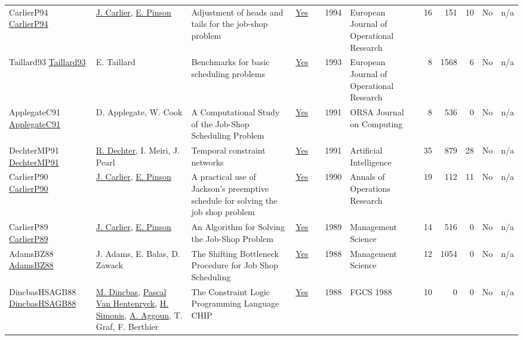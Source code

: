 {\begin{longtable}{>{\raggedright\arraybackslash}p{3cm}>{\raggedright\arraybackslash}p{6cm}>{\raggedright\arraybackslash}p{6.5cm}rrrp{2.5cm}rrrrr}
CarlierP94 \href{http://dx.doi.org/10.1016/0377-2217(94)90379-4}{CarlierP94} & \hyperref[auth:a858]{J. Carlier}, \hyperref[auth:a859]{E. Pinson} & Adjustment of heads and tails for the job-shop problem & \href{../works/CarlierP94.pdf}{Yes} & \cite{CarlierP94} & 1994 & European Journal of Operational Research & 16 & 151 & 10 & No & n/a\\
Taillard93 \href{http://dx.doi.org/10.1016/0377-2217(93)90182-m}{Taillard93} & E. Taillard & Benchmarks for basic scheduling problems & \href{../works/Taillard93.pdf}{Yes} & \cite{Taillard93} & 1993 & European Journal of Operational Research & 8 & 1568 & 6 & No & n/a\\
ApplegateC91 \href{http://dx.doi.org/10.1287/ijoc.3.2.149}{ApplegateC91} & D. Applegate, W. Cook & A Computational Study of the Job-Shop Scheduling Problem & \href{../works/ApplegateC91.pdf}{Yes} & \cite{ApplegateC91} & 1991 & ORSA Journal on Computing & 8 & 536 & 0 & No & n/a\\
DechterMP91 \href{http://dx.doi.org/10.1016/0004-3702(91)90006-6}{DechterMP91} & \hyperref[auth:a303]{R. Dechter}, I. Meiri, J. Pearl & Temporal constraint networks & \href{../works/DechterMP91.pdf}{Yes} & \cite{DechterMP91} & 1991 & Artificial Intelligence & 35 & 879 & 28 & No & n/a\\
CarlierP90 \href{http://dx.doi.org/10.1007/bf03543071}{CarlierP90} & \hyperref[auth:a858]{J. Carlier}, \hyperref[auth:a859]{E. Pinson} & A practical use of Jackson's preemptive schedule for solving the job shop problem & \href{../works/CarlierP90.pdf}{Yes} & \cite{CarlierP90} & 1990 & Annals of Operations Research & 19 & 112 & 11 & No & n/a\\
CarlierP89 \href{http://dx.doi.org/10.1287/mnsc.35.2.164}{CarlierP89} & \hyperref[auth:a858]{J. Carlier}, \hyperref[auth:a859]{E. Pinson} & An Algorithm for Solving the Job-Shop Problem & \href{../works/CarlierP89.pdf}{Yes} & \cite{CarlierP89} & 1989 & Management Science & 14 & 516 & 0 & No & n/a\\
AdamsBZ88 \href{http://dx.doi.org/10.1287/mnsc.34.3.391}{AdamsBZ88} & J. Adams, E. Balas, D. Zawack & The Shifting Bottleneck Procedure for Job Shop Scheduling & \href{../works/AdamsBZ88.pdf}{Yes} & \cite{AdamsBZ88} & 1988 & Management Science & 12 & 1054 & 0 & No & n/a\\
DincbasHSAGB88 \href{}{DincbasHSAGB88} & \hyperref[auth:a726]{M. Dincbas}, \hyperref[auth:a149]{Pascal Van Hentenryck}, \hyperref[auth:a17]{H. Simonis}, \hyperref[auth:a734]{A. Aggoun}, T. Graf, F. Berthier & The Constraint Logic Programming Language {CHIP} & \href{../works/DincbasHSAGB88.pdf}{Yes} & \cite{DincbasHSAGB88} & 1988 & FGCS 1988 & 10 & 0 & 0 & No & n/a\\

\end{longtable}}
